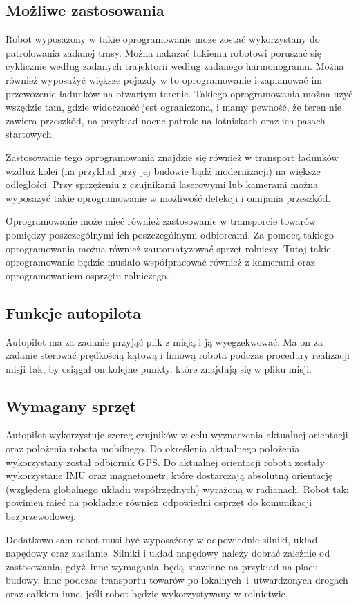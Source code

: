 {    \subsection{Możliwe zastosowania}
    {
        Robot wyposażony w takie oprogramowanie może zostać wykorzystany do patrolowania zadanej trasy. Można nakazać takiemu robotowi poruszać się cyklicznie według zadanych trajektorii według zadanego harmonogramu. 
        Można również wyposażyć większe pojazdy w to oprogramowanie i zaplanować im przewożenie ładunków na otwartym terenie.
        Takiego oprogramowania można użyć wszędzie tam, gdzie widoczność jest ograniczona, i mamy pewność, że teren nie zawiera przeszkód, na przykład nocne patrole na lotniskach oraz ich pasach startowych.
        
        Zastosowanie tego oprogramowania znajdzie się również w transport ładunków wzdłuż kolei (na przykład przy jej budowie bądź modernizacji) na większe odległości. Przy sprzężeniu z czujnikami laserowymi lub kamerami można wyposażyć takie oprogramowanie w możliwość detekcji i omijania przeszkód.

        \newpage

        Oprogramowanie może mieć również zastosowanie w transporcie towarów pomiędzy poszczególnymi ich poszczególnymi odbiorcami. 
        Za pomocą takiego oprogramowania można również zautomatyzować sprzęt rolniczy. Tutaj takie oprogramowanie będzie musiało współpracować również z kamerami oraz oprogramowaniem  osprzętu rolniczego.
    }
    
    \subsection{Funkcje autopilota}
    {
        Autopilot ma za zadanie przyjąć plik z misją i ją wyegzekwować. Ma on za zadanie sterować prędkością kątową i liniową robota podczas procedury realizacji misji tak, by osiągał on kolejne punkty, które znajdują się w pliku misji. 
    }
    
    \subsection{Wymagany sprzęt}
    {
        Autopilot wykorzystuje szereg czujników w celu wyznaczenia aktualnej orientacji oraz położenia robota mobilnego. Do określenia aktualnego położenia wykorzystany został odbiornik GPS. Do aktualnej orientacji robota zostały wykorzystane IMU oraz magnetometr, które dostarczają absolutną orientację (względem globalnego układu współrzędnych) wyrażoną w radianach. Robot taki powinien mieć na pokładzie również odpowiedni osprzęt do komunikacji bezprzewodowej.
        
        Dodatkowo sam robot musi być wyposażony w odpowiednie silniki, układ napędowy oraz zasilanie. Silniki i układ napędowy należy dobrać zależnie od zastosowania, gdyż inne wymagania~będą~stawiane na przykład na placu budowy,  inne podczas transportu towarów po lokalnych~i~utwardzonych drogach oraz całkiem inne, jeśli robot będzie wykorzystywany w rolnictwie. 
    }
}